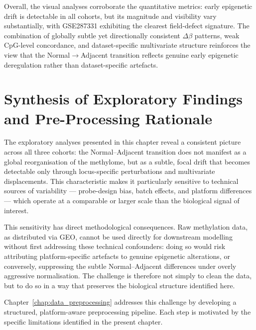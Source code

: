 Overall, the visual analyses corroborate the quantitative metrics: early 
epigenetic drift is detectable in all cohorts, but its magnitude and 
visibility vary substantially, with GSE287331 exhibiting the clearest 
field-defect signature.  
The combination of globally subtle yet directionally consistent 
$\Delta\beta$ patterns, weak CpG-level concordance, and 
dataset-specific multivariate structure reinforces the view that the 
Normal$\rightarrow$Adjacent transition reflects genuine early 
epigenetic deregulation rather than dataset-specific artefacts.


\section{Synthesis of Exploratory Findings and Pre-Processing Rationale}
\label{sec:cap3_conclusions}

The exploratory analyses presented in this chapter reveal a consistent picture 
across all three cohorts: the Normal--Adjacent transition does not manifest as a 
global reorganisation of the methylome, but as a subtle, focal drift that becomes 
detectable only through locus-specific perturbations and multivariate 
displacements. This characteristic makes it particularly sensitive to technical 
sources of variability --- probe-design bias, batch effects, and platform 
differences --- which operate at a comparable or larger scale than the biological 
signal of interest.

This sensitivity has direct methodological consequences. Raw methylation data, 
as distributed via GEO, cannot be used directly for downstream modelling without 
first addressing these technical confounders: doing so would risk attributing 
platform-specific artefacts to genuine epigenetic alterations, or conversely, 
suppressing the subtle Normal--Adjacent differences under overly aggressive 
normalisation. The challenge is therefore not simply to clean the data, but to do 
so in a way that preserves the biological structure identified here.

Chapter~\ref{chap:data_preprocessing} addresses this challenge by developing a structured, platform-aware 
preprocessing pipeline. Each step is motivated by the specific limitations 
identified in the present chapter.
